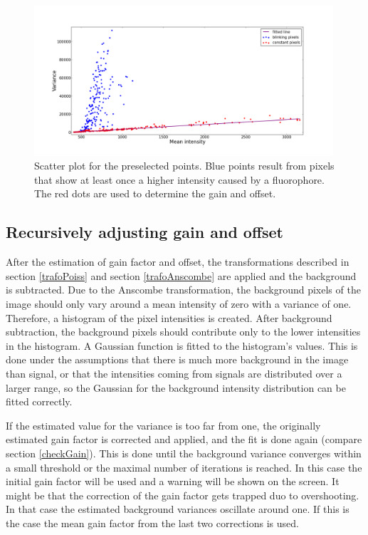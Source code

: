 \begin{figure}
\centering
\includegraphics[width = 0.99\textwidth]{pictures/skellamplot.png}
	\caption{Scatter plot for the preselected points. Blue points result from pixels that show at least once a higher intensity caused by a fluorophore. The red dots are used to determine the gain and offset.}
	\label{skellamplot}
\end{figure}
\subsection{Recursively adjusting gain and offset}
After the estimation of gain factor and offset, the transformations described in section \ref{trafoPoiss} and section \ref{trafoAnscombe} are applied and the background is subtracted.\newline
Due to the Anscombe transformation, the background pixels of the image should only vary around a mean intensity of zero with a variance of one. Therefore, a histogram of the pixel intensities is created. After background subtraction, the background pixels should contribute only to the lower intensities in the histogram. A Gaussian function is fitted to the histogram's values. This is done under the assumptions that there is much more background in the image than signal, or that the intensities coming from signals are distributed over a larger range, so the Gaussian for the background intensity distribution can be fitted correctly.\newline


If the estimated value for the variance is too far from one, the originally estimated gain factor is corrected and applied, and the fit is done again (compare section \ref{checkGain}). This is done until the background variance converges within a small threshold or the maximal number of iterations is reached. In this case the initial gain factor will be used and a warning will be shown on the screen.\newline
It might be that the correction of the gain factor gets trapped duo to overshooting. In that case the estimated background variances oscillate around one. If this is the case the mean gain factor from the last two corrections is used.
